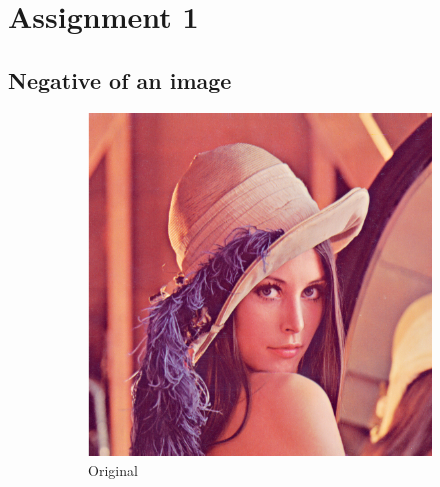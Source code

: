 \documentclass[a4paper,16pt]{article}
\begin{document}
	
	
	\tableofcontents
	
	\newpage
	
	\section{Assignment 1}
	\vspace{0.2in}
	\subsection{Negative of an image}
	\indent	
	\begin{figure}[h!]
		\begin{subfigure}[h]{0.4\linewidth}
			\includegraphics[width=\linewidth]{original}
			\caption{Original}
		\end{subfigure}
		\hfill
		\begin{subfigure}[h]{0.4\linewidth}

\end{subfigure}
\end{figure}
\end{document}
